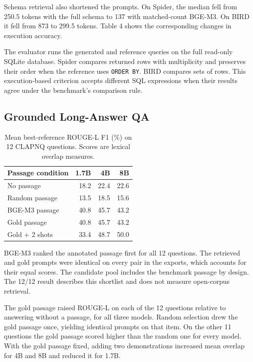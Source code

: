 \documentclass{article}
\begin{document}
Schema retrieval also shortened the prompts. On Spider, the median fell from 250.5 tokens with
the full schema to 137 with matched-count BGE-M3. On BIRD it fell from 873 to 299.5 tokens.
Table 4 shows the corresponding changes in execution accuracy.

The evaluator runs the generated and reference queries on the full read-only SQLite database.
Spider compares returned rows with multiplicity and preserves their order when the reference
uses \texttt{ORDER BY}. BIRD compares sets of rows. This execution-based criterion accepts
different SQL expressions when their results agree under the benchmark's comparison rule.

\newpage

\subsection{Grounded Long-Answer QA}

\begin{table}[H]
\centering
\caption{Mean best-reference ROUGE-L F1 (\%) on 12 CLAPNQ questions. Scores are lexical overlap
measures.}
\small
\begin{tabular*}{\columnwidth}{@{\extracolsep{\fill}}lrrr@{}}
\toprule
\textbf{Passage condition} & \textbf{1.7B} & \textbf{4B} & \textbf{8B} \\
\midrule
No passage & 18.2 & 22.4 & 22.6 \\
Random passage & 13.5 & 18.5 & 15.6 \\
BGE-M3 passage & 40.8 & 45.7 & 43.2 \\
Gold passage & 40.8 & 45.7 & 43.2 \\
Gold + 2 shots & 33.4 & 48.7 & 50.0 \\
\bottomrule
\end{tabular*}
\end{table}

BGE-M3 ranked the annotated passage first for all 12 questions. The retrieved and gold prompts were
identical on every pair in the exports, which accounts for their equal scores. The candidate pool
includes the benchmark passage by design. The 12/12 result describes this shortlist and does not
measure open-corpus retrieval.

The gold passage raised ROUGE-L on each of the 12 questions relative to answering without a
passage, for all three models. Random selection drew the gold passage once, yielding identical
prompts on that item. On the other 11 questions the gold passage scored higher than the random
one for every model. With the gold passage fixed, adding two demonstrations increased mean overlap
for 4B and 8B and reduced it for 1.7B.
\end{document}
